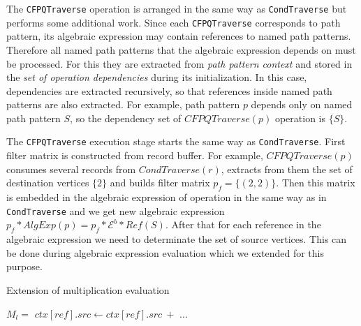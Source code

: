 The \lstinline{CFPQTraverse} operation is arranged in the same way as \lstinline{CondTraverse} but performs some additional work. Since each \lstinline{CFPQTraverse} corresponds to path pattern, its algebraic expression may contain references to named path patterns. Therefore all named path patterns that the algebraic expression depends on must be processed. For this they are extracted from \textit{path pattern context} and stored in the \textit{set of operation dependencies} during its initialization. In this case, dependencies are extracted recursively, so that references inside named path patterns are also extracted. For example, path pattern $p$ depends only on named path pattern $S$, so the dependency set of $CFPQTraverse(p)$ operation is $\{S\}$.

The \lstinline{CFPQTraverse} execution stage starts the same way as \lstinline{CondTraverse}. First filter matrix is constructed from record buffer. For example, $CFPQTraverse(p)$ consumes several records from $CondTraverse(r)$, extracts from them the set of destination vertices $\{2\}$ and builds filter matrix $p_f = \{(2, 2)\}$. Then this matrix is embedded in the algebraic expression of operation in the same way as in \lstinline{CondTraverse} and we get new algebraic expression $p_f * AlgExp(p) = p_f * \mathcal{E}^b * Ref(S)$. After that for each reference in the algebraic expression we need to determinate the set of source vertices. This can be done during algebraic expression evaluation which we extended for this purpose.

\begin{algorithm}
\begin{algorithmic}[1]
\caption{Extension of multiplication evaluation}
\label{alg:multiplication-extension}
\State $M_l =$ 
    \State $ctx[ref].src \gets ctx[ref].src~+$ 
\EndIf
\State $...$ 
\EndFunction
\end{algorithmic}
\end{algorithm}

